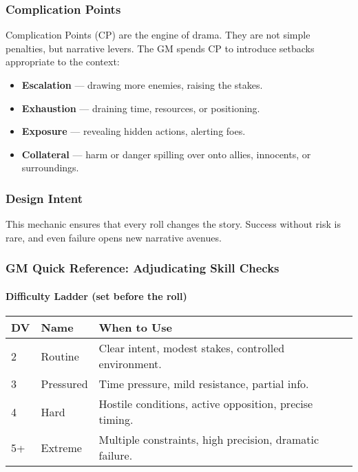 \subsubsection{Complication Points}
Complication Points (CP) are the engine of drama. They are not simple penalties, but narrative levers. The GM spends CP to introduce setbacks appropriate to the context:
\begin{itemize}
  \item \textbf{Escalation} — drawing more enemies, raising the stakes.
  \item \textbf{Exhaustion} — draining time, resources, or positioning.
  \item \textbf{Exposure} — revealing hidden actions, alerting foes.
  \item \textbf{Collateral} — harm or danger spilling over onto allies, innocents, or surroundings.
\end{itemize}

\subsubsection{Design Intent}
This mechanic ensures that every roll changes the story. Success without risk is rare, and even failure opens new narrative avenues.

\subsubsection{GM Quick Reference: Adjudicating Skill Checks}

\paragraph{Difficulty Ladder (set before the roll)}
\begin{center}
\begin{tabular}{@{}lll@{}}
\toprule
\textbf{DV} & \textbf{Name} & \textbf{When to Use} \\
\midrule
2 & Routine   & Clear intent, modest stakes, controlled environment. \\
3 & Pressured & Time pressure, mild resistance, partial info. \\
4 & Hard      & Hostile conditions, active opposition, precise timing. \\
5+& Extreme   & Multiple constraints, high precision, dramatic failure. \\
\bottomrule
\end{tabular}
\end{center}

